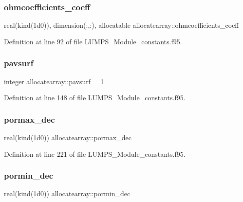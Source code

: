 \subsubsection{\texorpdfstring{ohmcoefficients\+\_\+coeff}{ohmcoefficients\_coeff}}
{\footnotesize\ttfamily real(kind(1d0)), dimension(\+:,\+:), allocatable allocatearray\+::ohmcoefficients\+\_\+coeff}



Definition at line 92 of file L\+U\+M\+P\+S\+\_\+\+Module\+\_\+constants.\+f95.

\mbox{\label{namespaceallocatearray_a5a6ce5dda0d024d7333d95ba544f38c9}} 
\subsubsection{\texorpdfstring{pavsurf}{pavsurf}}
{\footnotesize\ttfamily integer allocatearray\+::pavsurf = 1}



Definition at line 148 of file L\+U\+M\+P\+S\+\_\+\+Module\+\_\+constants.\+f95.

\mbox{\label{namespaceallocatearray_a077f163b1bb6fc5d136d362575a1294e}} 
\subsubsection{\texorpdfstring{pormax\+\_\+dec}{pormax\_dec}}
{\footnotesize\ttfamily real(kind(1d0)) allocatearray\+::pormax\+\_\+dec}



Definition at line 221 of file L\+U\+M\+P\+S\+\_\+\+Module\+\_\+constants.\+f95.

\mbox{\label{namespaceallocatearray_ac4df536a53bb496d38aca9441ccf18f6}} 
\subsubsection{\texorpdfstring{pormin\+\_\+dec}{pormin\_dec}}
{\footnotesize\ttfamily real(kind(1d0)) allocatearray\+::pormin\+\_\+dec}



